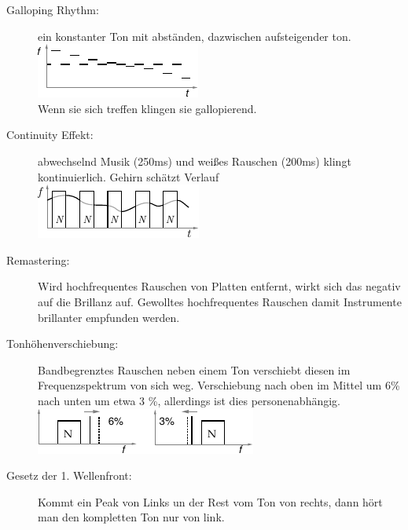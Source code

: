 \documentclass[fs, footer]{latex4ei}
\begin{document}
\begin{multicols}{4}
{\begin{description}
	\item[Galloping Rhythm:] ein konstanter Ton mit abständen, dazwischen aufsteigender ton.\\
	\includegraphics[width=0.8\columnwidth]{./img/galloping.pdf}\\
		Wenn sie sich treffen klingen sie gallopierend.\\


	\item[Continuity Effekt:] abwechselnd Musik (250ms) und weißes Rauschen (200ms) klingt kontinuierlich. Gehirn schätzt Verlauf\\
	\includegraphics[width=0.8\columnwidth]{./img/continuity.pdf}

	\item[Remastering:] Wird hochfrequentes Rauschen von Platten entfernt, wirkt sich das negativ auf die Brillanz auf.
	Gewolltes hochfrequentes Rauschen damit Instrumente brillanter empfunden werden.


	\item[Tonhöhenverschiebung:]
	Bandbegrenztes Rauschen neben einem Ton verschiebt diesen im Frequenzspektrum von sich weg. Verschiebung nach oben im Mittel um 6\% nach unten um etwa 3 \%, allerdings ist dies personenabhängig.\\
	\includegraphics[width=0.9\columnwidth]{./img/tonhoehe.pdf}
	
	\item[Gesetz der 1. Wellenfront:] Kommt ein Peak von Links un der Rest vom Ton von rechts, dann hört man den kompletten Ton nur von link.
	

\end{description}}
\end{multicols}
\end{document}
